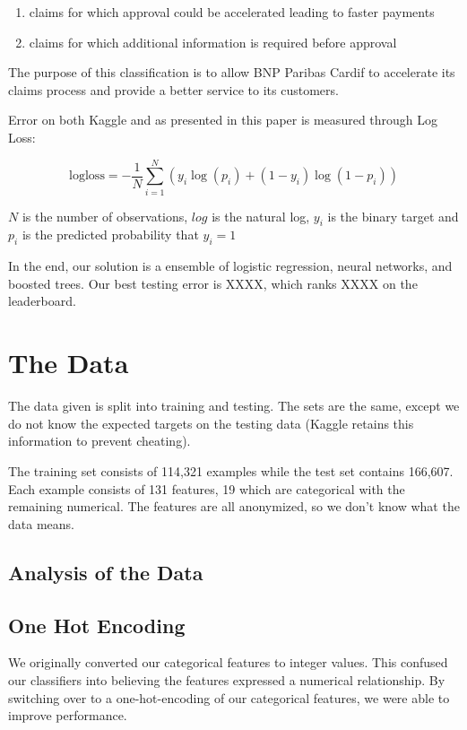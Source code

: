 \documentclass[twoside,11pt]{article}
\theoremstyle{definition}
\begin{document}
  \begin{enumerate}
    \item claims for which approval could be accelerated leading to faster payments
    \item claims for which additional information is required before approval
  \end{enumerate}

  The purpose of this classification is to allow BNP Paribas Cardif to accelerate its claims process and provide a better service to its customers.

  Error on both Kaggle and as presented in this paper is measured through Log Loss:

  \[ \text{logloss} = - \frac{1}{N} \sum\limits_{i=1}^N (y_i \log(p_i) + (1 - y_i) \log(1 - p_i)) \]

  $N$ is the number of observations, $log$ is the natural log, $y_i$ is the binary target and $p_i$ is the predicted probability that $y_i = 1$

  In the end, our solution is a ensemble of logistic regression, neural networks, and boosted trees. Our best testing error is XXXX, which ranks XXXX on the leaderboard.

\section{The Data}

  The data given is split into training and testing. The sets are the same, except we do not know the expected targets on the testing data (Kaggle retains this information to prevent cheating).

  The training set consists of 114,321 examples while the test set contains 166,607. Each example consists of 131 features, 19 which are categorical with the remaining numerical. The features are all anonymized, so we don't know what the data means.

  \subsection{Analysis of the Data}

  \subsection{One Hot Encoding}
    We originally converted our categorical features to integer values. This confused our classifiers into believing the features expressed a numerical relationship. By switching over to a one-hot-encoding of our categorical features, we were able to improve performance.
\end{document}
